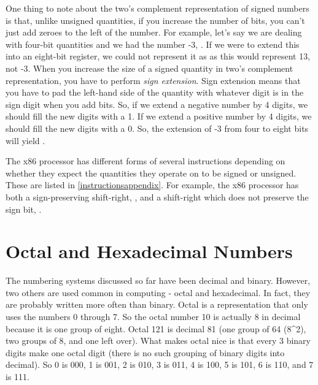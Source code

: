 One thing to note about the two's complement representation of signed numbers is that, unlike unsigned quantities, if you increase the number
of bits, you can't just add zeroes to the left of the number.  For example,
let's say we are dealing with four-bit quantities and we had the number
-3, .  If we were to extend this into an eight-bit
register, we could not represent it as  as this
would represent 13, not -3.  When you increase the size of a signed quantity
in two's complement representation, you have to perform 
\emph{sign extension}.  Sign extension means that you have
to pad the left-hand side of the quantity with whatever digit is in the
sign digit when you add bits.  So, if we extend a negative number by 4 digits, 
we should fill the new digits with a 1.  If we extend a positive number by 4 digits, we
should fill the new digits with a 0.  So, the extension of -3 from four to
eight bits will yield .

The x86 processor has different forms of several instructions depending on
whether they expect the quantities they operate on to be signed or unsigned.
These are listed in \autoref{instructionsappendix}.  For example,
the x86 processor has both a sign-preserving shift-right, , and a shift-right which does not preserve the sign bit, .

\section{Octal and Hexadecimal Numbers}
\label{octalhexadecimal}

The numbering systems discussed so far have been decimal and binary.
However, two others are used common in computing - octal and hexadecimal.
In fact, they are probably written more often than binary.  Octal is
a representation that only uses the numbers 0 through 7.  So the octal
number 10 is actually 8 in decimal because it is one group of eight.
Octal 121 is decimal 81 (one group of
64 (8\textasciicircum2), two groups of 8, and one left over).  What makes octal nice
is that every 3 binary digits make one octal digit (there is no such grouping
of binary digits into decimal).  So 0 is 000, 1 is 001, 2 is 010, 3 is
011, 4 is 100, 5 is 101, 6 is 110, and 7 is 111.


